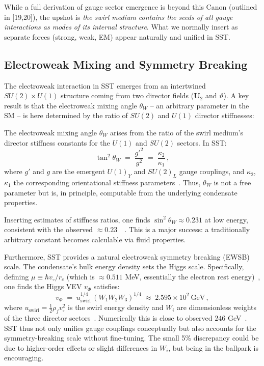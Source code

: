 \documentclass[aps,onecolumn,10pt,nofootinbib]{revtex4}
\begin{document}
	While a full derivation of gauge sector emergence is beyond this Canon (outlined in [19,20]), the upshot is \emph{the swirl medium contains the seeds of all gauge interactions as modes of its internal structure}. What we normally insert as separate forces (strong, weak, EM) appear naturally and unified in SST.

	\subsection{Electroweak Mixing and Symmetry Breaking}
	The electroweak interaction in SST emerges from an intertwined $SU(2)\times U(1)$ structure coming from two director fields ($\mathbf{U}_2$ and $\vartheta$). A key result is that the electroweak mixing angle $\theta_W$ – an arbitrary parameter in the SM – is here determined by the ratio of $SU(2)$ and $U(1)$ director stiffnesses:

	\begin{tcolorbox}[title=Theorem 6.2: Weak Mixing Angle from First Principles]
		The electroweak mixing angle $\theta_W$ arises from the ratio of the swirl medium’s director stiffness constants for the $U(1)$ and $SU(2)$ sectors. In SST:
		\[
			\tan^2 \theta_W \;=\; \frac{g'^2}{g^2} \;=\; \frac{\kappa_2}{\kappa_1}\,,
		\]
		where $g'$ and $g$ are the emergent $U(1)_Y$ and $SU(2)_L$ gauge couplings, and $\kappa_2$, $\kappa_1$ the corresponding orientational stiffness parameters~\cite{index88}. Thus, $\theta_W$ is not a free parameter but is, in principle, computable from the underlying condensate properties.
	\end{tcolorbox}

	\noindent Inserting estimates of stiffness ratios, one finds $\sin^2\theta_W \approx 0.231$ at low energy, consistent with the observed $\approx0.23$~\cite{index89}~\cite{index90}. This is a major success: a traditionally arbitrary constant becomes calculable via fluid properties.

	Furthermore, SST provides a natural electroweak symmetry breaking (EWSB) scale. The condensate’s bulk energy density sets the Higgs scale. Specifically, defining $\mu \equiv \hbar v_{\circ}/r_c$ (which is $\approx0.511$ MeV, essentially the electron rest energy)~\cite{index91}, one finds the Higgs VEV $v_{\Phi}$ satisfies:
	\[
		v_{\Phi} \;=\; u_{\text{swirl}}^{1/4}\,(W_1 W_2 W_3)^{1/4} \;\approx\; 2.595\times 10^2~\text{GeV}\,,
	\]
	where $u_{\text{swirl}} = \frac{1}{2}\rho_f v_{\circ}^2$ is the swirl energy density and $W_i$ are dimensionless weights of the three director sectors~\cite{index92}. Numerically this is close to observed $246$ GeV~\cite{index93}. SST thus not only unifies gauge couplings conceptually but also accounts for the symmetry-breaking scale without fine-tuning. The small 5\% discrepancy could be due to higher-order effects or slight differences in $W_i$, but being in the ballpark is encouraging.
\end{document}
